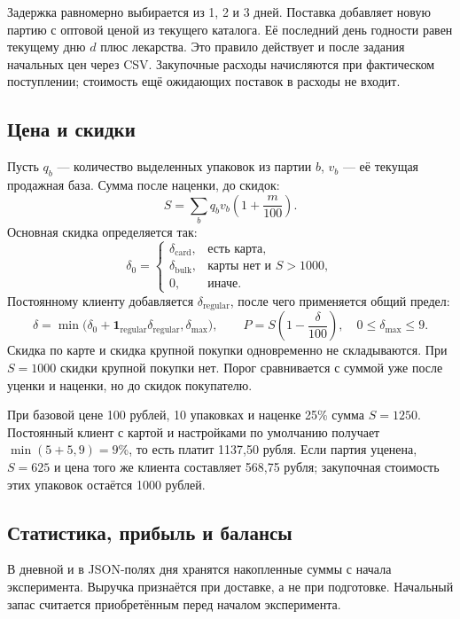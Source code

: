 Задержка равномерно выбирается из 1, 2 и 3 дней. Поставка добавляет новую
партию с оптовой ценой из текущего каталога. Её последний день годности
равен текущему дню $d$ плюс  лекарства.
Это правило действует и после задания начальных цен через CSV.
Закупочные расходы начисляются при фактическом поступлении;
стоимость ещё ожидающих поставок в расходы не входит.

\subsection{Цена и скидки}
Пусть $q_b$ --- количество выделенных упаковок из партии $b$, $v_b$ ---
её текущая продажная база. Сумма после наценки, до скидок:
\begin{equation}
  S=\sum_b q_bv_b\left(1+\frac{m}{100}\right).
\end{equation}
Основная скидка определяется так:
\begin{equation}
  \delta_0=
  \begin{cases}
    \delta_{\mathrm{card}}, & \text{есть карта},\\
    \delta_{\mathrm{bulk}}, & \text{карты нет и }S>1000,\\
    0, & \text{иначе}.
  \end{cases}
\end{equation}
Постоянному клиенту добавляется $\delta_{\mathrm{regular}}$, после чего
применяется общий предел:
\begin{equation}
  \delta=\min\bigl(\delta_0+\mathbf{1}_{\mathrm{regular}}
                   \delta_{\mathrm{regular}},\delta_{\max}\bigr),
  \qquad P=S\left(1-\frac{\delta}{100}\right),\quad 0\leq\delta_{\max}\leq9.
\end{equation}
Скидка по карте и скидка крупной покупки одновременно не складываются.
При $S=1000$ скидки крупной покупки нет. Порог сравнивается с суммой уже
после уценки и наценки, но до скидок покупателю.

При базовой цене 100 рублей, 10 упаковках и наценке 25\% сумма $S=1250$.
Постоянный клиент с картой и настройками по умолчанию получает
$\min(5+5,9)=9$\%, то есть платит 1137{,}50 рубля. Если партия уценена,
$S=625$ и цена того же клиента составляет 568{,}75 рубля; закупочная
стоимость этих упаковок остаётся 1000 рублей.

\subsection{Статистика, прибыль и балансы}
В дневной  и в JSON-полях дня хранятся накопленные суммы
с начала эксперимента. Выручка признаётся при доставке, а не при подготовке.
Начальный запас считается приобретённым перед началом эксперимента.

